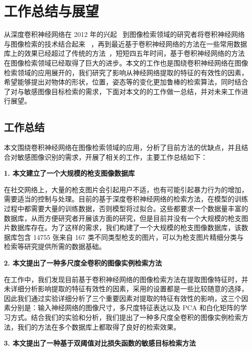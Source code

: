 
\chapter{工作总结与展望}\label{chapter:conclusion}

从深度卷积神经网络在 2012 年的兴起~\cite{Krizhevsky2012ImageNetCW} 到图像检索领域的研究者将卷积神经网络与图像检索的技术结合起来~\cite{Babenko2014NeuralCF,Gong2014MultiscaleOP} ，再到最近基于卷积神经网络的方法在一些常用数据库上的效果已经超过了传统的方法~\cite{Gordo2016DeepIR,Noh2017LargeScaleIR}，短短四五年时间，基于卷积神经网络的方法在图像检索领域已经取得了巨大的进步。本文的工作也是围绕卷积神经网络在图像检索领域的应用展开的，我们研究了影响从神经网络提取的特征的有效性的因素，希望能够提出对物体的形状，位置，姿态等的变化更加鲁棒的检索算法，同时结合了对与敏感图像目标检索的需求，下面对本文的的工作做一总结，并对未来工作进行展望。

\section{工作总结}
本文围绕卷积神经网络在图像检索领域的应用，分析了目前方法的优缺点，并且结合对敏感图像识别的需求，开展了相关的工作，主要工作总结如下：

\textbf{1. 本文建立了一个大规模的枪支图像数据库}

在社交网络上，大量的枪支图片会引起用户不适，也有可能引起暴力行为的增加，需要适当的控制与处理。目前的基于深度卷积神经网络的检索方法，在模型的训练过程中都需要大量的训练数据，否则模型将过拟合。这些都要求一个数据量丰富的数据库，从而方便研究者开展该方面的研究，但是目前并没有一个大规模的枪支图片数据库存在。为了这样的需求，我们构建了一个大规模的枪支图像数据库，该数据库包含 14755 张来自 167 类不同类型枪支的图片，可以为枪支图片精细分类与检索等研究提供所需的数据基础。

\textbf{2. 本文提出了一种多尺度全卷积的图像实例检索方法}

在工作中，我们发现目前基于卷积神经网络的图像检索方法在提取图像特征时，并未详细分析影响提取的特征有效性的因素，采用的设置都是一些比较随意的选择，因此我们通过实验详细分析了三个重要因素对提取的特征有效性的影响，这三个因素分别是：输入神经网络的图像尺寸，多尺度特征表达以及 PCA 和白化矩阵的学习方式。结合我们的实验和分析，我们提出了一种多尺度全卷积的图像实例检索方法，我们的方法在多个数据库上都取得了良好的检索效果。

\textbf{3. 本文提出了一种基于双阈值对比损失函数的敏感目标检索方法}


